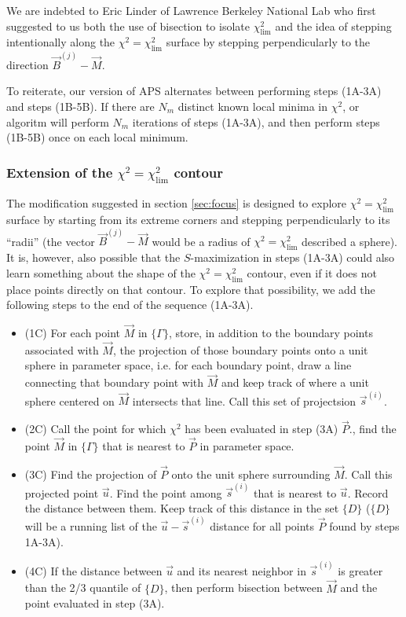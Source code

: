 \documentclass[useAMS,usenatbib]{aastex}
\begin{document}
We are indebted to Eric Linder of Lawrence Berkeley National Lab who first suggested to us
both the use of bisection to isolate $\chi^2_\text{lim}$ and the idea of stepping
intentionally along the $\chi^2=\chi^2_\text{lim}$ surface by stepping perpendicularly to the
direction $\vec{B}^{(j)}-\vec{M}$.

To reiterate, our version of APS alternates between performing steps (1A-3A) and steps
(1B-5B).  If there are $N_m$ distinct known local minima in $\chi^2$, or algoritm will perform
$N_m$ iterations of steps (1A-3A), and then perform steps (1B-5B) once on each local minimum.

\subsubsection{Extension of the $\chi^2=\chi^2_\text{lim}$ contour}
\label{sec:unitSphere}

The modification suggested in section \ref{sec:focus} is designed to explore 
$\chi^2=\chi^2_\text{lim}$ surface by starting from its extreme corners and stepping
perpendicularly to its ``radii'' (the vector $\vec{B}^{(j)}-\vec{M}$ would be a radius of
$\chi^2=\chi^2_\text{lim}$ described a sphere).  It is, however, also possible
that the $S$-maximization in steps (1A-3A) could also learn something about the
shape of the $\chi^2=\chi^2_\text{lim}$ contour, even if it does not place
points directly on that contour.  To explore that possibility, we add the
following steps to the end of the sequence (1A-3A).

\begin{itemize}
\item(1C) For each point $\vec{M}$ in $\{\Gamma\}$, store, 
in addition to the boundary
points associated with $\vec{M}$, the projection of those boundary points
onto a unit sphere in parameter space, i.e. for each boundary point, draw a line
connecting that boundary point with $\vec{M}$ and keep track of
where a unit sphere centered on $\vec{M}$ intersects that line.  Call this set
of projectsion $\vec{s}^{(i)}$.
\\
\item(2C) Call the point for which $\chi^2$ has been evaluated in step (3A)
$\vec{P}$., find the
point $\vec{M}$ in $\{\Gamma\}$ that is nearest to $\vec{P}$ in parameter space.
\\
\item(3C) Find the
projection of $\vec{P}$ onto the unit sphere surrounding $\vec{M}$.  
Call this projected point $\vec{u}$.  Find the point among
$\vec{s}^{(i)}$ that is nearest to $\vec{u}$.  Record the distance between them.
Keep track of this distance in the set $\{D\}$ ($\{D\}$ will be a running list
of the $\vec{u}-\vec{s}^{(i)}$ distance for all points $\vec{P}$ found by steps
1A-3A).
\\
\item(4C) If the distance between $\vec{u}$ and its nearest neighbor in
$\vec{s}^{(i)}$ is greater than the 2/3 quantile of $\{D\}$,
then perform bisection between $\vec{M}$ and the point evaluated in step (3A).
\end{itemize}
\end{document}
